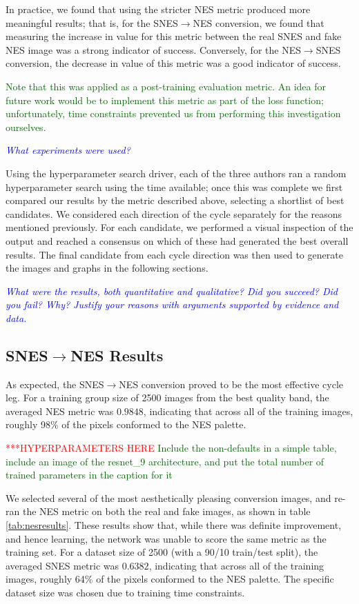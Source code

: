 \documentclass[10pt,twocolumn,letterpaper]{article}
\begin{document}
In practice, we found that using the stricter NES metric produced more meaningful results; that is, for the SNES$\rightarrow$NES conversion, we found that measuring the increase in value for this metric between the real SNES and fake NES image was a strong indicator of success. Conversely, for the NES$\rightarrow$SNES conversion, the decrease in value of this metric was a good indicator of success.

\textcolor{darkgreen}{Note that this was applied as a post-training evaluation metric. An idea for future work would be to implement this metric as part of the loss function; unfortunately, time constraints prevented us from performing this investigation ourselves.}

\textit{\textcolor{blue}{What experiments were used?}}

Using the hyperparameter search driver, each of the three authors ran a random hyperparameter search using the time available; once this was complete we first compared our results by the metric described above, selecting a shortlist of best candidates. We considered each direction of the cycle separately for the reasons mentioned previously. For each candidate, we performed a visual inspection of the output and reached a consensus on which of these had generated the best overall results. The final candidate from each cycle direction was then used to generate the images and graphs in the following sections.

\textit{\textcolor{blue}{What were the results, both quantitative and qualitative? Did you succeed? Did you fail? Why? Justify your reasons with arguments supported by evidence and data.}}

\subsection{SNES$\rightarrow$NES Results}

As expected, the SNES$\rightarrow$NES conversion proved to be the most effective cycle leg. For a training group size of 2500 images from the best quality band, the averaged NES metric was $0.9848$, indicating that across all of the training images, roughly 98\% of the pixels conformed to the NES palette.


\textcolor{red}{***HYPERPARAMETERS HERE}
\textcolor{darkgreen} {Include the non-defaults in a simple table, include an image of the resnet\_9 architecture, and put the total number of trained parameters in the caption for it}

We selected several of the most aesthetically pleasing conversion images, and re-ran the NES metric on both the real and fake images, as shown in table \ref{tab:nesresults}.
These results show that, while there was definite improvement, and hence learning, the network was unable to score the same metric as the training set. For a dataset size of 2500 (with a 90/10 train/test split), the averaged SNES metric was $0.6382$, indicating that across all of the training images, roughly 64\% of the pixels conformed to the NES palette. The specific dataset size was chosen due to training time constraints.
\end{document}
